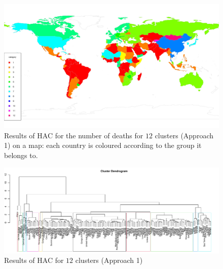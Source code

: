 \documentclass[a4paper,12pt]{article}
\numberwithin{equation}{section}
\begin{document}
\begin{figure}[t!]
\begin{minipage}[t]{0.98\textwidth}
\includegraphics[width=\textwidth]{plots/deaths/map}
\caption{Results of HAC for the number of deaths for $12$ clusters (Approach 1) on a map: each country is coloured according to the group it belongs to.}\label{fig:map_deaths}
\end{minipage}
\end{figure}



\newpage 
\FloatBarrier
\begin{figure}
\includegraphics[width=\textwidth]{plots/14days/dendrogram}
\caption{Results of HAC for $12$ clusters (Approach 1)}\label{fig:dend}
\end{figure}
\end{document}
